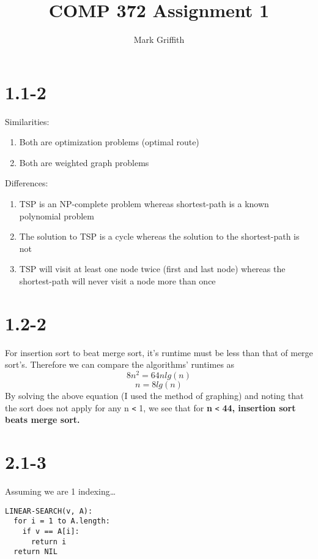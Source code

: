 \documentclass{article}
\begin{document}
\title{COMP 372 Assignment 1}
\author{Mark Griffith}

\maketitle


\section{1.1-2}
Similarities:
\begin{enumerate}
  \item	Both are optimization problems (optimal route)
  \item Both are weighted graph problems
\end{enumerate}
Differences:
\begin{enumerate}
  \item TSP is an NP-complete problem whereas shortest-path is a known polynomial problem
  \item The solution to TSP is a cycle whereas the solution to the shortest-path is not
  \item TSP will visit at least one node twice (first and last node) whereas the shortest-path will never visit a node more than once
\end{enumerate}

\section{1.2-2}
For insertion sort to beat merge sort, it’s runtime must be less than that of merge sort’s. Therefore we can compare the algorithms’ runtimes as
\begin{equation*}
  \label{simple_equation}
    8n^2 = 64nlg(n)
\end{equation*}
\begin{equation*}
  \label{simple_equation}
    n = 8lg(n)
\end{equation*}
By solving the above equation (I used the method of graphing) and noting that the sort does not
apply for any n \verb|<| 1, we see that for \textbf{n} \verb|<|  \textbf{44, insertion sort beats merge sort.}

\section{2.1-3}
Assuming we are 1 indexing\ldots
\begin{verbatim}
LINEAR-SEARCH(v, A):
  for i = 1 to A.length:
    if v == A[i]:
      return i
  return NIL
\end{verbatim}
\end{document}
